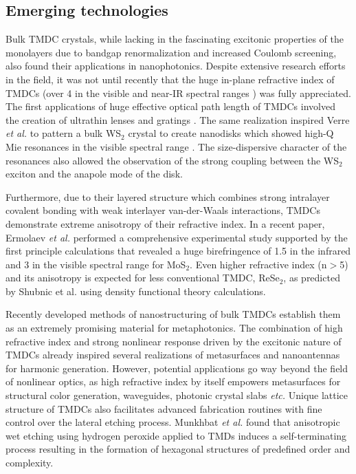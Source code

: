 \documentclass[journal=chreay,manuscript=review]{achemso}
\begin{document}
\subsection{Emerging technologies}

Bulk TMDC crystals, while lacking in the fascinating excitonic properties of the monolayers due to bandgap renormalization and increased Coulomb screening, also found their applications in nanophotonics. Despite extensive research efforts in the field, it was not until recently that the huge in-plane refractive index of TMDCs (over 4 in the visible and near-IR spectral ranges \cite{beal1979kramers}) was fully appreciated. The first applications of huge effective optical path length of TMDCs involved the creation of ultrathin lenses and gratings \cite{yang2016atomically, liu2018ultrathin}. The same realization inspired Verre \textit{et al.} to pattern a bulk WS$_2$ crystal to create nanodisks which showed high-Q Mie resonances  in the visible spectral range \cite{verre2019transition}. The size-dispersive character of the resonances also allowed the observation of the strong coupling between the WS$_2$ exciton and the anapole mode of the disk.  

Furthermore, due to their layered structure which combines strong intralayer covalent bonding with weak interlayer van-der-Waals interactions, TMDCs demonstrate extreme anisotropy of their refractive index. In a recent paper, Ermolaev \textit{et al.} \cite{Ermolaev2021} performed a comprehensive experimental study supported by the first principle calculations that revealed a huge birefringence of 1.5 in the infrared and 3 in the visible spectral range for MoS$_2$. Even higher refractive index (n$>$5) and its anisotropy is expected for less conventional TMDC, ReSe$_2$, as predicted by Shubnic et al. using density functional theory calculations\cite{shubnic2020high}. 

Recently developed methods of nanostructuring of bulk TMDCs establish them as an extremely promising material for metaphotonics. The combination of high refractive index and strong nonlinear response driven by the excitonic nature of TMDCs already inspired several realizations of metasurfaces and nanoantennas for harmonic generation\cite{nauman2021tunable}. However, potential applications go way beyond the field of nonlinear optics, as high refractive index by itself empowers metasurfaces for structural color generation, waveguides, photonic crystal slabs \textit{etc.} \cite{munkhbat2022nanostructured} Unique lattice structure of TMDCs also facilitates advanced fabrication routines with fine control over the lateral etching process. Munkhbat \textit{et al.} found that anisotropic wet etching using hydrogen peroxide applied to TMDs induces a self-terminating process resulting in the formation of hexagonal structures of predefined order and complexity.\cite{munkhbat2020transition}
\end{document}
